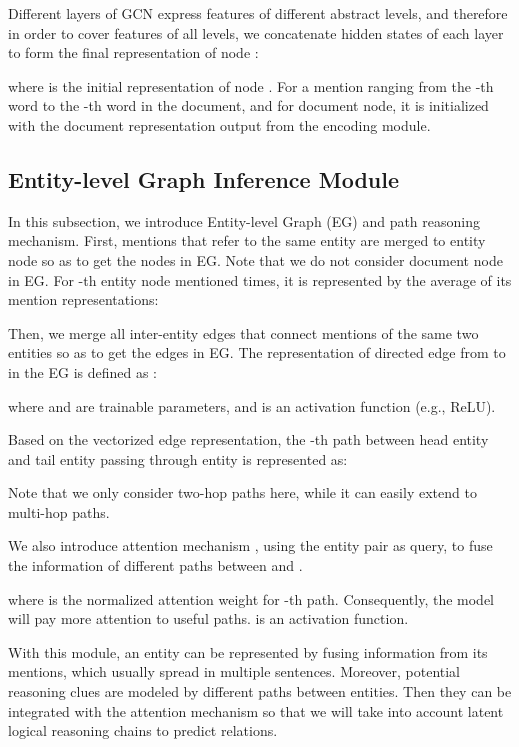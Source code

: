 \documentclass[11pt,a4paper]{article}
\begin{document}
Different layers of GCN express features of different abstract levels, and therefore in order to cover features of all levels, we concatenate hidden states of each layer to form the final representation of node :

where  is the initial representation of node . For a mention ranging from the -th word to the -th word in the document,  and for document node, it is initialized with the document representation output from the encoding module.



\subsection{Entity-level Graph Inference Module\label{ssec:inference}}


In this subsection, we introduce Entity-level Graph (EG) and path reasoning mechanism. 
First, mentions that refer to the same entity are merged to entity node so as to get the nodes in EG. Note that we do not consider document node in EG. For -th entity node  mentioned  times, it is represented by the average of its  mention representations:


Then, we merge all inter-entity edges that connect mentions of the same two entities so as to get the edges in EG. The representation of directed edge from  to  in the EG is defined as :

where  and  are trainable parameters, and  is an activation function (e.g., ReLU).

Based on the vectorized edge representation, the -th path between head entity  and tail entity  passing through entity  is represented as:

Note that we only consider two-hop paths here, while it can easily extend to multi-hop paths.

We also introduce attention mechanism \citep{attention-15}, using the entity pair  as query, to fuse the information of different paths between  and . 



where  is the normalized attention weight for -th path. Consequently, the model will pay more attention to useful paths.  is an activation function.

With this module, an entity can be represented by fusing information from its mentions, which usually spread in multiple sentences. Moreover, potential reasoning clues are modeled by different paths between entities. Then they can be integrated with the attention mechanism so that we will take into account latent logical reasoning chains to predict relations.
\end{document}
